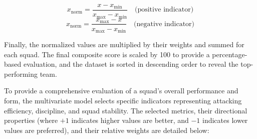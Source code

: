 \documentclass[a4paper,12pt]{report}
\begin{document}
\begin{equation}
    x_{\text{norm}} = \frac{x - x_{\min}}{x_{\max} - x_{\min}} \quad \text{(positive indicator)}
\end{equation}
\begin{equation}
    x_{\text{norm}} = \frac{x_{\max} - x}{x_{\max} - x_{\min}} \quad \text{(negative indicator)}
\end{equation}

Finally, the normalized values are multiplied by their weights and summed for each squad. The final composite score is scaled by 100 to provide a percentage-based evaluation, and the dataset is sorted in descending order to reveal the top-performing team.

To provide a comprehensive evaluation of a squad's overall performance and form, the multivariate model selects specific indicators representing attacking efficiency, discipline, and squad stability. The selected metrics, their directional properties (where $+1$ indicates higher values are better, and $-1$ indicates lower values are preferred), and their relative weights are detailed below:
\end{document}

